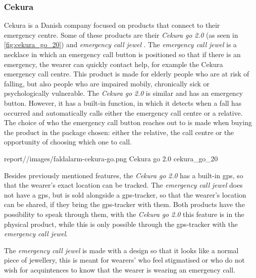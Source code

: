 \subsubsection{Cekura}




Cekura is a Danish company focused on products that connect to their emergency centre. Some of these products are their \textit{Cekura go 2.0} \cite{noauthor_ny_nodate} (as seen in \autoref{fig:cekura_go_20}) and \textit{emergency call jewel} \cite{noauthor_tryghedsalarm_nodate}. The \textit{emergency call jewel} is a necklace in which an emergency call button is positioned so that if there is an emergency, the wearer can quickly contact help, for example the Cekura emergency call centre. This product is made for elderly people who are at risk of falling, but also people who are impaired mobily, chronically sick or psychologically vulnerable. The \textit{Cekura go 2.0} is similar and has an emergency button. However, it has a built-in function, in which it detects when a fall has occurred and automatically calls either the emergency call centre or a relative. The choice of who the emergency call button reaches out to is made when buying the product in the package chosen: either the relative, the call centre or the opportunity of choosing which one to call. 

    {report//images/faldalarm-cekura-go.png}
    {Cekura go 2.0}
    {cekura_go_20}

Besides previously mentioned features, the \textit{Cekura go 2.0 }has a built-in \gls{gps}, so that the wearer's exact location can be tracked. The \textit{emergency call jewel }does not have a \gls{gps}, but is sold alongside a \gls{gps}-tracker, so that the wearer’s location can be shared, if they bring the \gls{gps}-tracker with them. Both products have the possibility to speak through them, with the \textit{Cekura go 2.0} this feature is in the physical product, while this is only possible through the \gls{gps}-tracker with the \textit{emergency call jewel}. 

The \textit{emergency call jewel }is made with a design so that it looks like a normal piece of jewellery, this is meant for wearers' who feel stigmatised or who do not wish for acquintences to know that the wearer is wearing an emergency call. 
